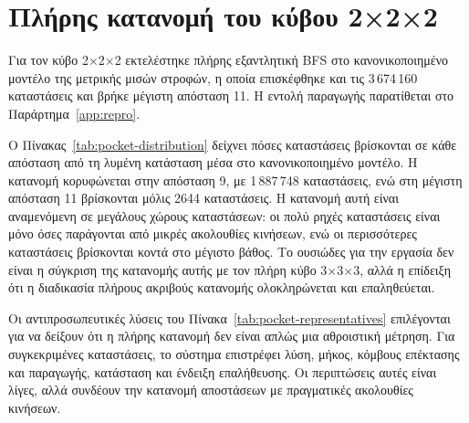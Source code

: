 \begin{table}[htbp]\centering

\caption[Γραμμές εξάντλησης χρονικού ορίου του κύριου σώματος μετρήσεων]{Γραμμές  του κύριου σώματος μετρήσεων: η αποθηκευμένη εκτέλεση δεν παρήγαγε καμία, καθώς οι βαθύτερες μη ολοκληρώσεις καταγράφονται ως . Πηγή: .}
\label{tab:timeout-cases}
\end{table}

\section{Πλήρης κατανομή του κύβου 2×2×2}
\label{sec:experiments-pocket}

Για τον κύβο 2×2×2 εκτελέστηκε πλήρης εξαντλητική BFS στο κανονικοποιημένο μοντέλο της μετρικής μισών στροφών, η οποία επισκέφθηκε και τις 3\,674\,160 καταστάσεις και βρήκε μέγιστη απόσταση 11. Η εντολή παραγωγής παρατίθεται στο Παράρτημα~\ref{app:repro}.

Ο Πίνακας~\ref{tab:pocket-distribution} δείχνει πόσες καταστάσεις βρίσκονται σε κάθε απόσταση από τη λυμένη κατάσταση μέσα στο κανονικοποιημένο μοντέλο. Η κατανομή κορυφώνεται στην απόσταση 9, με 1\,887\,748 καταστάσεις, ενώ στη μέγιστη απόσταση 11 βρίσκονται μόλις 2644 καταστάσεις. Η κατανομή αυτή είναι αναμενόμενη σε μεγάλους χώρους καταστάσεων: οι πολύ ρηχές καταστάσεις είναι μόνο όσες παράγονται από μικρές ακολουθίες κινήσεων, ενώ οι περισσότερες καταστάσεις βρίσκονται κοντά στο μέγιστο βάθος. Το ουσιώδες για την εργασία δεν είναι η σύγκριση της κατανομής αυτής με τον πλήρη κύβο 3×3×3, αλλά η επίδειξη ότι η διαδικασία πλήρους ακριβούς κατανομής ολοκληρώνεται και επαληθεύεται.

\begin{table}[htbp]\centering

\caption[Πλήρης κατανομή αποστάσεων του κύβου 2×2×2]{Πλήρης κατανομή αποστάσεων του κύβου 2×2×2 στο κανονικοποιημένο μοντέλο της μετρικής μισών στροφών: πλήθος καταστάσεων ανά απόσταση από τη λυμένη κατάσταση, με κορύφωση στην απόσταση 9 και μέγιστη απόσταση 11. Πηγή: .}
\label{tab:pocket-distribution}
\end{table}

Οι αντιπροσωπευτικές λύσεις του Πίνακα~\ref{tab:pocket-representatives} επιλέγονται για να δείξουν ότι η πλήρης κατανομή δεν είναι απλώς μια αθροιστική μέτρηση. Για συγκεκριμένες καταστάσεις, το σύστημα επιστρέφει λύση, μήκος, κόμβους επέκτασης και παραγωγής, κατάσταση  και ένδειξη επαλήθευσης. Οι περιπτώσεις αυτές είναι λίγες, αλλά συνδέουν την κατανομή αποστάσεων με πραγματικές ακολουθίες κινήσεων.

